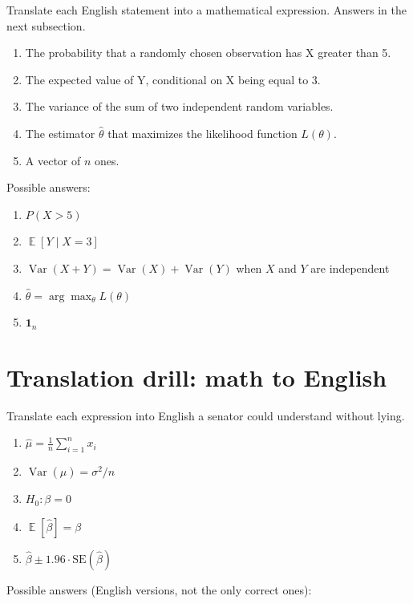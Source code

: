 \documentclass[
  letterpaper,
  11pt,
  twoside,
  openany]{scrbook}
\providecommand{\tightlist}{%
  \setlength{\itemsep}{0pt}\setlength{\parskip}{0pt}}
\newcommand{\E}{\operatorname{\mathbb{E}}}
\newcommand{\Var}{\operatorname{Var}}
\begin{document}
Translate each English statement into a mathematical expression. Answers
in the next subsection.

\begin{enumerate}
\def\labelenumi{\arabic{enumi}.}
\tightlist
\item
  The probability that a randomly chosen observation has X greater than
  5.
\item
  The expected value of Y, conditional on X being equal to 3.
\item
  The variance of the sum of two independent random variables.
\item
  The estimator \(\hat\theta\) that maximizes the likelihood function
  \(L(\theta)\).
\item
  A vector of \(n\) ones.
\end{enumerate}

Possible answers:

\begin{enumerate}
\def\labelenumi{\arabic{enumi}.}
\tightlist
\item
  \(P(X > 5)\)
\item
  \(\E[Y \mid X = 3]\)
\item
  \(\Var(X + Y) = \Var(X) + \Var(Y)\) when \(X\) and \(Y\) are
  independent
\item
  \(\hat\theta = \arg\max_\theta L(\theta)\)
\item
  \(\bm{1}_n\)
\end{enumerate}

\section{Translation drill: math to
English}\label{translation-drill-math-to-english}

Translate each expression into English a senator could understand
without lying.

\begin{enumerate}
\def\labelenumi{\arabic{enumi}.}
\tightlist
\item
  \(\hat\mu = \frac{1}{n}\sum_{i=1}^{n} x_i\)
\item
  \(\Var(\hat\mu) = \sigma^2 / n\)
\item
  \(H_0: \beta = 0\)
\item
  \(\E[\hat\beta] = \beta\)
\item
  \(\hat\beta \pm 1.96 \cdot \text{SE}(\hat\beta)\)
\end{enumerate}

Possible answers (English versions, not the only correct ones):
\end{document}
